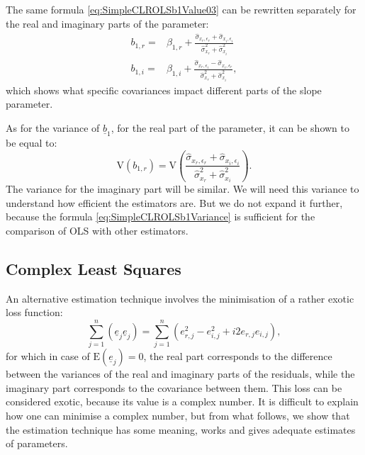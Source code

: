 \documentclass[
]{book}
\begin{document}
The same formula \eqref{eq:SimpleCLROLSb1Value03} can be rewritten separately for the real and imaginary parts of the parameter:
\begin{equation}
    \begin{aligned}
        b_{1,r} = & \beta_{1,r} + \frac{\hat{\sigma}_{x_r, \epsilon_r} + \hat{\sigma}_{x_i, \epsilon_i}}{\hat{\sigma}_{x_r}^2 + \hat{\sigma}_{x_i}^2} \\
        b_{1,i} = & \beta_{1,i} + \frac{\hat{\sigma}_{x_r, \epsilon_i} - \hat{\sigma}_{x_i, \epsilon_r}}{\hat{\sigma}_{x_r}^2 + \hat{\sigma}_{x_i}^2} ,
    \end{aligned}
    \label{eq:SimpleCLROLSb1Value04}
\end{equation}
which shows what specific covariances impact different parts of the slope parameter.

As for the variance of \(\underline{b}_1\), for the real part of the parameter, it can be shown to be equal to:
\begin{equation}
    \mathrm{V}(b_{1,r}) = \mathrm{V}\left(\frac{\hat{\sigma}_{x_r, \epsilon_r} + \hat{\sigma}_{x_i, \epsilon_i}}{\hat{\sigma}_{x_r}^2 + \hat{\sigma}_{x_i}^2}\right) .
    \label{eq:SimpleCLROLSb1Variance}
\end{equation}
The variance for the imaginary part will be similar. We will need this variance to understand how efficient the estimators are. But we do not expand it further, because the formula \eqref{eq:SimpleCLROLSb1Variance} is sufficient for the comparison of OLS with other estimators.

\hypertarget{SCLREstimationCLS}{%
\subsection{Complex Least Squares}\label{SCLREstimationCLS}}

An alternative estimation technique involves the minimisation of a rather exotic loss function:
\begin{equation}
    \sum_{j=1}^n (\underline{e}_j \underline{e}_j) = \sum_{j=1}^n (e_{r,j}^2 - e_{i,j}^2 + i 2 e_{r,j} e_{i,j}),
    \label{eq:SimpleCLRCLSLoss}
\end{equation}
for which in case of \(\mathrm{E}(\underline{e}_j)=0\), the real part corresponds to the difference between the variances of the real and imaginary parts of the residuals, while the imaginary part corresponds to the covariance between them. This loss can be considered exotic, because its value is a complex number. It is difficult to explain how one can minimise a complex number, but from what follows, we show that the estimation technique has some meaning, works and gives adequate estimates of parameters.
\end{document}
